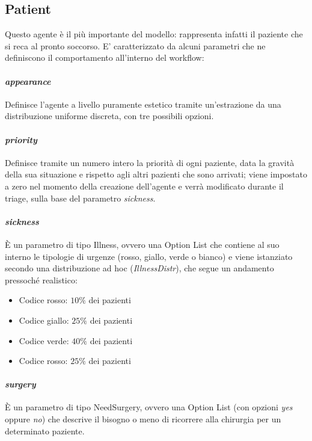 \subsection{Patient}

Questo agente è il più importante del modello: rappresenta infatti il paziente che si reca al pronto soccorso. E' caratterizzato da alcuni parametri che ne definiscono il comportamento all'interno del workflow: 

\paragraph{\textit{appearance}}
Definisce l'agente a livello puramente estetico tramite un'estrazione da una distribuzione uniforme discreta, con tre possibili opzioni.  

\paragraph{\textit{priority}}
Definisce tramite un numero intero la priorità di ogni paziente, data la gravità della sua situazione e rispetto agli altri pazienti che sono arrivati; viene impostato a zero nel momento della creazione dell’agente e verrà modificato durante il triage, sulla base del parametro \textit{sickness}.

\paragraph{\textit{sickness}}
È un parametro di tipo Illness, ovvero una Option List che contiene al suo interno le tipologie di urgenze (rosso, giallo, verde o bianco) e viene istanziato secondo una distribuzione ad hoc (\textit{IllnessDistr}), che segue un andamento pressoché realistico: 
\begin{itemize}
    \item Codice rosso: $10\%$ dei pazienti
    \item Codice giallo: $25\%$ dei pazienti
    \item Codice verde: $40\%$ dei pazienti
    \item Codice rosso: $25\%$ dei pazienti
\end{itemize}

\paragraph{\textit{surgery}}
È un parametro di tipo NeedSurgery, ovvero una Option List (con opzioni \textit{yes} oppure \textit{no}) che descrive il bisogno o meno di ricorrere alla chirurgia per un determinato paziente.

